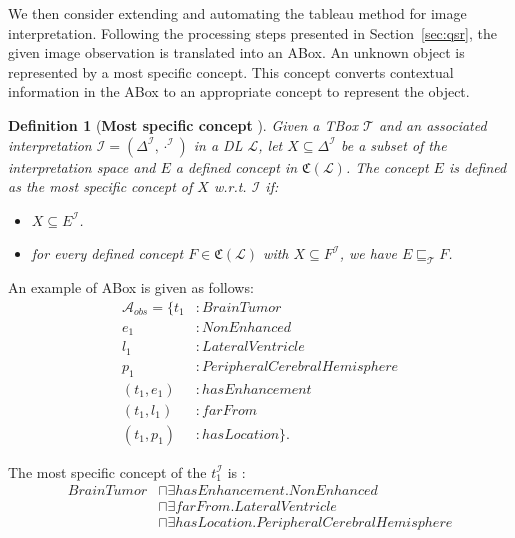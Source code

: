 \documentclass{article}
\newtheorem{mydef}{Definition}
\begin{document}
We then consider extending and automating the tableau method for image interpretation.
Following the processing steps presented in Section~\ref{sec:qsr}, the given image observation is translated into an ABox.
An unknown object is represented by a most specific concept. 
This concept converts contextual information in the ABox to an appropriate concept to represent the object.
\begin{mydef}[\textbf{Most specific concept} \cite{atif2014explanatory}]
Given a TBox $\mathcal{T}$ and an associated interpretation $\mathcal{I}=(\Delta^{\mathcal{I}}, \cdot^{\mathcal{I}})$ in a DL $\mathcal{L}$,
let $X\subseteq \Delta^{\mathcal{I}}$ be a subset of the interpretation space and $E$ a defined concept in $\mathfrak{C}(\mathcal{L})$. 
The concept $E$ is defined as the most specific concept of $X$ w.r.t. $\mathcal{I}$ if:
\begin{itemize}
 \item $X \subseteq E^{\mathcal{I}}$.
 \item for every defined concept $F\in\mathfrak{C}(\mathcal{L})$ with $X \subseteq F^{\mathcal{I}}$, we have $E \sqsubseteq_{\mathcal{T}} F$.
\end{itemize}
\label{def:msc}
\end{mydef}

An example of ABox is given as follows:
\begin{align*}
\mathcal{A}_{obs} =\{t_1&: BrainTumor\\
 e_1&: NonEnhanced\\
 l_1&: LateralVentricle\\
 p_1&: PeripheralCerebralHemisphere\\
 (t_1, e_1)&:hasEnhancement\\
 (t_1, l_1)&:farFrom\\
 (t_1, p_1)&:hasLocation\}.
\end{align*}

The most specific concept of the  $t_1^\mathcal{I}$ is :\vspace{-0.3cm}
\begin{align*}
 BrainTumor&\sqcap \exists hasEnhancement.NonEnhanced \\
 &\sqcap \exists farFrom.LateralVentricle\\
 &\sqcap \exists hasLocation.PeripheralCerebralHemisphere
\end{align*}
\end{document}

